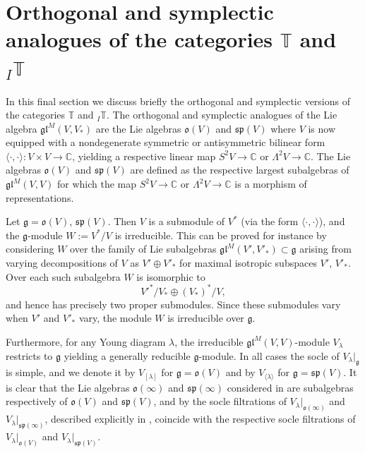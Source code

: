 \documentclass[11pt]{article}
\theoremstyle{plain}
\theoremstyle{nonumberplain}
\theoremstyle{plain}
\numberwithin{equation}{section}
\theoremstyle{nonumberplain}
\newcommand\bC{{\mathbb C}}
\newcommand\bT{{\mathbb T}}
\newcommand\fg{{\mathfrak g}}
\newcommand\fo{{\mathfrak o}}
\newcommand\fp{{\mathfrak p}}
\newcommand\fs{{\mathfrak s}}
\newcommand\fgl{\mathfrak{gl}}
\newcommand\1{{\bf 1}}
\begin{document}
\section{Orthogonal and symplectic analogues of the categories $\bT$ and ${}_I\bT$}\label{se:bcd}

In this final section we discuss briefly the orthogonal and symplectic versions of the categories $\bT$ and $_I \bT$. The orthogonal and symplectic analogues of the Lie algebra $\fgl^M(V,V_*)$ are the Lie algebras $\fo(V)$ and $\fs\fp(V)$ where $V$ is now equipped with a nondegenerate symmetric or antisymmetric bilinear form $\langle \cdot, \cdot \rangle:V\times V \rightarrow \mathbb{C}$, yielding a respective linear map $S^2 V\rightarrow \bC$ or $\Lambda^2 V \rightarrow \bC$. The Lie algebras $\fo(V)$ and $\fs\fp(V)$ are defined as the respective largest subalgebras of $\fgl^M(V,V)$ for which the map $S^2 V\rightarrow \bC$ or $\Lambda^2 V \rightarrow \bC$ is a morphism of representations.

Let $\fg=\fo(V)$, $\fs\fp(V)$. Then $V$ is a submodule of $V^*$ (via the form $\langle \cdot,\cdot\rangle$), and the $\fg$-module $W:=V^*/V$ is irreducible. This can be proved for instance by considering $W$ over the family of Lie subalgebras $\fgl^M(V',V'_*)\subset \fg$ arising from varying decompositions of $V$ as $V'\oplus V'_{*}$ for maximal isotropic subspaces $V'$, $V'_{*}$. Over each such subalgebra $W$ is isomorphic to \begin{equation*}
V'^*/V_*\oplus (V_*)^*/V,
\end{equation*} and hence has precisely two proper submodules. Since these submodules vary when $V'$ and $V'_*$ vary, the module $W$ is irreducible over $\fg$.

 Furthermore, for any Young diagram $\lambda$, the irreducible $\fgl^M(V,V)$-module $V_{\lambda}$ restricts to $\fg$ yielding a generally reducible $\fg$-module. In all cases the socle of $V_{\lambda}|_{\fg}$ is simple, and we denote it by $V_{[\lambda]}$ for $\fg=\fo(V)$ and by $V_{\langle\lambda \rangle}$ for $\fg=\fs\fp(V)$. It is clear that the Lie algebras $\fo(\infty)$ and $\fs\fp(\infty)$ considered in \cite{PS} are subalgebras respectively of $\fo(V)$ and $\fs\fp(V)$, and by \cite[Theorem 7.10]{PS2} the socle filtrations of $V_{\lambda}|_{\fo(\infty)}$ and $V_{\lambda}|_{\fs\fp(\infty)}$, described explicitly in \cite{PS}, coincide with the respective socle filtrations of $V_{\lambda}|_{\fo(V)}$ and $V_{\lambda}|_{\fs\fp(V)}$.
\end{document}
